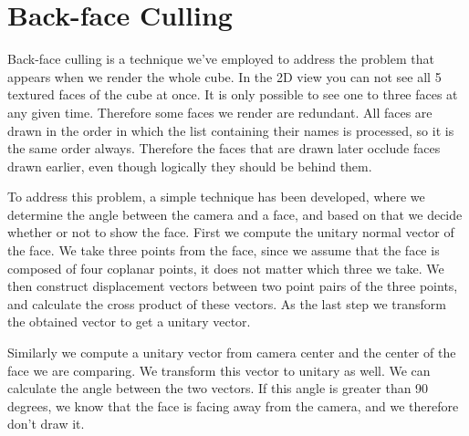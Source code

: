 \section{Back-face Culling}

Back-face culling is a technique we've employed to address the problem that appears when we render the whole cube. In the 2D view you can not see all 5 textured faces of the cube at once. It is only possible to see one to three faces at any given time. Therefore some faces we render are redundant. All faces are drawn in the order in which the list containing their names is processed, so it is the same order always. Therefore the faces that are drawn later occlude faces drawn earlier, even though logically they should be behind them. 

To address this problem, a simple technique has been developed, where we determine the angle between the camera and a face, and based on that we decide whether or not to show the face. First we compute the unitary normal vector of the face. We take three points from the face, since we assume that the face is composed of four coplanar points, it does not matter which three we take. We then construct displacement vectors between two point pairs of the three points, and calculate the cross product of these vectors. As the last step we transform the obtained vector to get a unitary vector. 

Similarly we compute a unitary vector from camera center and the center of the face we are comparing. We transform this vector to unitary as well. We can calculate the angle between the two vectors. If this angle is greater than 90 degrees, we know that the face is facing away from the camera, and we therefore don't draw it.